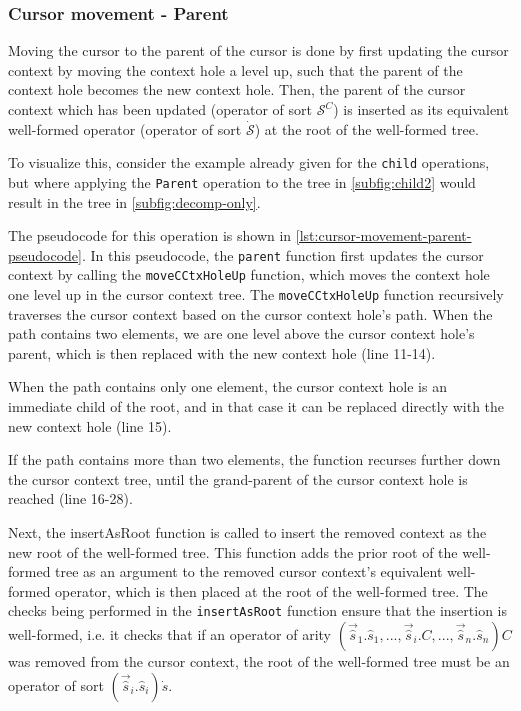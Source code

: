 \subsubsection{Cursor movement - Parent}

Moving the cursor to the parent of the cursor is done by first updating the cursor context
by moving the context hole a level up, such that the parent of the context hole
becomes the new context hole. Then, the parent of the cursor context which has
been updated (operator of sort $\mathcal{S}^C$) is inserted as its equivalent
well-formed operator (operator of sort $\dot{\mathcal{S}}$) at the root of the
well-formed tree.

To visualize this, consider the example already given for the \texttt{child} operations, but where applying the \texttt{Parent} operation to the tree in \cref{subfig:child2} would result in the tree in \cref{subfig:decomp-only}.

The pseudocode for this operation is shown in
\cref{lst:cursor-movement-parent-pseudocode}.
In this pseudocode, the \texttt{parent} function first updates the cursor
context by calling the \texttt{moveCCtxHoleUp} function, which moves the
context hole one level up in the cursor context tree.
The \texttt{moveCCtxHoleUp} function recursively traverses the cursor
context based on the cursor context hole's path. When the path contains
two elements, we are one level above the cursor context hole's parent, which
is then replaced with the new context hole (line 11-14).

When the path contains only one element, the cursor context hole is an immediate child of the root, and in that case it can be replaced directly
with the new context hole (line 15).

If the path contains more than two elements, the function recurses further
down the cursor context tree, until the grand-parent of the cursor context hole
is reached (line 16-28).

Next, the insertAsRoot function is called to insert the removed context as the
new root of the well-formed tree. This function adds the prior root of the
well-formed tree as an argument to the removed cursor context's equivalent
well-formed operator, which is then placed at the root of the well-formed tree.
The checks being performed in the \texttt{insertAsRoot} function ensure that the
insertion is well-formed, i.e. it checks that if an operator of arity $(\vec{\hat{s}}_1.\hat{s}_1,...,\vec{\hat{s}}_i.C,...,\vec{\hat{s}}_n.\hat{s}_n)C$ was removed from the cursor context, the root of the well-formed tree must be an operator of sort $(\vec{\hat{s}}_i.\hat{s}_i)\dot{s}$.

